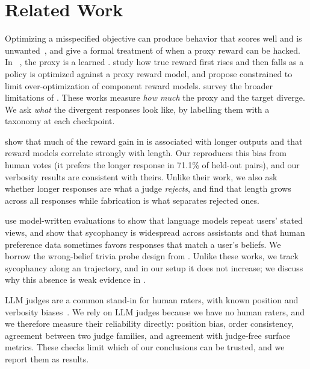\section{Related Work}
\label{sec:related}

Optimizing a misspecified objective can produce behavior that scores well and is unwanted~\citep{amodei2016concrete}, and \citet{skalse2022defining} give a formal treatment of when a proxy reward can be hacked.
In \rlhf~\citep{christiano2017deep,stiennon2020learning,ouyang2022training}, the proxy is a learned \rmodel.
\citet{gao2023scaling} study how true reward first rises and then falls as a policy is optimized against a proxy reward model, and \citet{moskovitz2023confronting} propose constrained \rlhf to limit over-optimization of component reward models.
\citet{casper2023open} survey the broader limitations of \rlhf.
These works measure \emph{how much} the proxy and the target diverge.
We ask \emph{what} the divergent responses look like, by labelling them with a taxonomy at each checkpoint.

\citet{singhal2023long} show that much of the reward gain in \rlhf is associated with longer outputs and that reward models correlate strongly with length.
Our \rmodel reproduces this bias from human votes (it prefers the longer response in 71.1\% of held-out pairs), and our verbosity results are consistent with theirs.
Unlike their work, we also ask whether longer responses are what a judge \emph{rejects}, and find that length grows across all responses while fabrication is what separates rejected ones.

\citet{perez2022discovering} use model-written evaluations to show that language models repeat users' stated views, and \citet{sharma2023towards} show that sycophancy is widespread across assistants and that human preference data sometimes favors responses that match a user's beliefs.
We borrow the wrong-belief trivia probe design from \citet{sharma2023towards}.
Unlike these works, we track sycophancy along an \rlhf trajectory, and in our setup it does not increase; we discuss why this absence is weak evidence in .

LLM judges are a common stand-in for human raters, with known position and verbosity biases~\citep{zheng2023judging,wang2023large}.
We rely on LLM judges because we have no human raters, and we therefore measure their reliability directly: position bias, order consistency, agreement between two judge families, and agreement with judge-free surface metrics.
These checks limit which of our conclusions can be trusted, and we report them as results.
